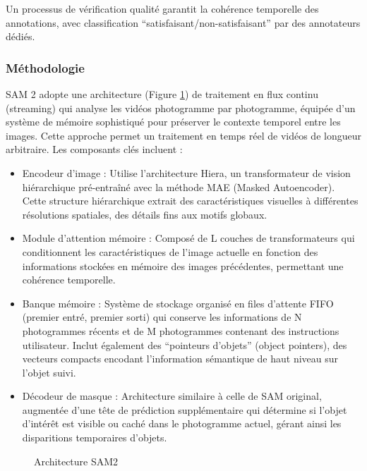 Un processus de vérification qualité garantit la cohérence temporelle des annotations, avec classification ``satisfaisant/non-satisfaisant'' par des annotateurs dédiés.

\subsubsection{Méthodologie}
SAM 2 adopte une architecture (Figure \ref{fig:ch2_sam2_11_architecture_sam2}) de traitement en flux continu (streaming) qui analyse les vidéos photogramme par photogramme, équipée d'un système de mémoire sophistiqué pour préserver le contexte temporel entre les images. Cette approche permet un traitement en temps réel de vidéos de longueur arbitraire. Les composants clés incluent :

\begin{itemize}
    \item Encodeur d'image : Utilise l'architecture Hiera, un transformateur de vision hiérarchique pré-entraîné avec la méthode MAE (Masked Autoencoder). Cette structure hiérarchique extrait des caractéristiques visuelles à différentes résolutions spatiales, des détails fins aux motifs globaux.
    
    \item Module d'attention mémoire : Composé de L couches de transformateurs qui conditionnent les caractéristiques de l'image actuelle en fonction des informations stockées en mémoire des images précédentes, permettant une cohérence temporelle.
    
    \item Banque mémoire : Système de stockage organisé en files d'attente FIFO (premier entré, premier sorti) qui conserve les informations de N photogrammes récents et de M photogrammes contenant des instructions utilisateur. Inclut également des ``pointeurs d'objets'' (object pointers), des vecteurs compacts encodant l'information sémantique de haut niveau sur l'objet suivi.
    
    \item Décodeur de masque : Architecture similaire à celle de SAM original, augmentée d'une tête de prédiction supplémentaire qui détermine si l'objet d'intérêt est visible ou caché dans le photogramme actuel, gérant ainsi les disparitions temporaires d'objets.
\end{itemize}

\begin{figure}[H]
    \centering
    \caption{Architecture SAM2 \cite{ravi_sam_2024}}
    \label{fig:ch2_sam2_11_architecture_sam2}
\end{figure}

